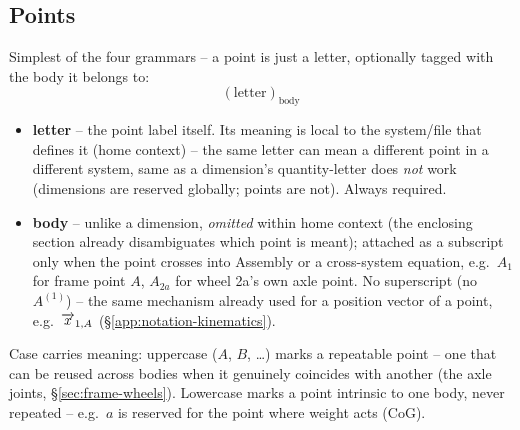 \subsection{Points}
\label{app:notation-points}
Simplest of the four grammars -- a point is just a letter, optionally tagged with the body it belongs to:
\begin{equation}
    (\text{letter})_{\text{body}}
\end{equation}
\begin{itemize}
    \item \textbf{letter} -- the point label itself. Its meaning is local to the system/file that defines it (home context) -- the same letter can mean a different point in a different system, same as a dimension's quantity-letter does \emph{not} work (dimensions are reserved globally; points are not). Always required.
    \item \textbf{body} -- unlike a dimension, \emph{omitted} within home context (the enclosing section already disambiguates which point is meant); attached as a subscript only when the point crosses into Assembly or a cross-system equation, e.g.\ $A_1$ for frame point $A$, $A_{2a}$ for wheel 2a's own axle point. No superscript (no $A^{(1)}$) -- the same mechanism already used for a position vector of a point, e.g.\ $\overrightarrow{x}_{1,A}$ (\S\ref{app:notation-kinematics}).
\end{itemize}

Case carries meaning: uppercase ($A$, $B$, \dots) marks a repeatable point -- one that can be reused across bodies when it genuinely coincides with another (the axle joints, \S\ref{sec:frame-wheels}). Lowercase marks a point intrinsic to one body, never repeated -- e.g.\ $a$ is reserved for the point where weight acts (CoG).
